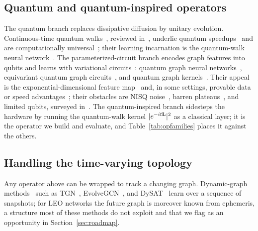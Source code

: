 \subsection{Quantum and quantum-inspired operators}
The quantum branch replaces dissipative diffusion by unitary evolution. Continuous-time
quantum walks~\cite{farhi1998quantumwalk,childs2004quantumwalk}, reviewed
in~\cite{kempe2003qwalk,venegas2012quantumwalks,portugal2013book}, underlie quantum
speedups~\cite{childs2003exponential} and are computationally
universal~\cite{childs2009universal}; their learning incarnation is the quantum-walk
neural network~\cite{dernbach2019qwnn}. The parameterized-circuit branch encodes graph
features into qubits and learns with variational
circuits~\cite{mitarai2018qcl,farhi2018classification,cerezo2021vqa}: quantum graph
neural networks~\cite{verdon2019qgnn}, equivariant quantum graph
circuits~\cite{mernyei2022equivariant}, and quantum graph kernels~\cite{henry2021quantumkernel}.
Their appeal is the exponential-dimensional feature
map~\cite{schuld2019featurespace,havlicek2019supervised,schuld2018book} and, in some
settings, provable data or speed advantages~\cite{huang2021power,liu2021rigorous};
their obstacles are NISQ noise~\cite{preskill2018nisq}, barren
plateaus~\cite{mcclean2018barren}, and limited qubits, surveyed
in~\cite{biamonte2017qml,dunjko2018review}. The quantum-inspired branch sidesteps the
hardware by running the quantum-walk kernel $|e^{-it\mathbf{L}}|^2$ as a classical layer; it is
the operator we build and evaluate, and Table~\ref{tab:opfamilies} places it against the
others.

\subsection{Handling the time-varying topology}
Any operator above can be wrapped to track a changing graph. Dynamic-graph
methods~\cite{kazemi2020dynamicsurvey} such as TGN~\cite{rossi2020tgn},
EvolveGCN~\cite{pareja2020evolvegcn}, and DySAT~\cite{sankar2020dysat} learn over a
sequence of snapshots; for LEO networks the future graph is moreover known from
ephemeris, a structure most of these methods do not exploit and that we flag as an
opportunity in Section~\ref{sec:roadmap}.

